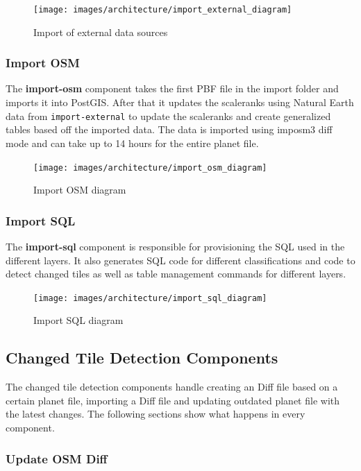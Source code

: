 \begin{figure}[H]
  \centering
  \texttt{[image: images/architecture/import\_external\_diagram]}
  \caption{Import of external data sources}
  \label{import_external_diagram} 
\end{figure}

\subsubsection{Import OSM}

The \textbf{import-osm} component takes the first PBF file in the import folder and imports it into PostGIS. After that it updates the scaleranks using Natural Earth data from \texttt{import-external} to update the scaleranks and create generalized tables based off the imported data. The data is imported using imposm3 diff mode and can take up to 14 hours for the entire planet file.

\begin{figure}[H]
  \centering
  \texttt{[image: images/architecture/import\_osm\_diagram]}
  \caption{Import OSM diagram}
\end{figure}

\subsubsection{Import SQL}

The \textbf{import-sql} component is responsible for provisioning the SQL used in the different layers. It also generates SQL code for different classifications and code to detect changed tiles as well as table management commands for different layers.

\begin{figure}[H]
  \centering
  \texttt{[image: images/architecture/import\_sql\_diagram]}
  \caption{Import SQL diagram}
\end{figure}

\subsection{Changed Tile Detection Components}

The changed tile detection components handle creating an \osm{} Diff file based on a certain \osm{} planet file, importing a \osm{} Diff file and updating outdated \osm{} planet file with the latest changes. The following sections show what happens in every component.

\subsubsection{Update OSM Diff}


